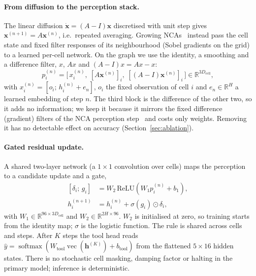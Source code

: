 \documentclass[10pt,twocolumn,letterpaper]{article}
\begin{document}
\paragraph{From diffusion to the perception stack.} The linear diffusion $\dot{\mathbf{x}} = (A-I)\mathbf{x}$ discretised with unit step gives $\mathbf{x}^{(n+1)} = A\mathbf{x}^{(n)}$, i.e.\ repeated averaging. Growing NCAs~\cite{mordvintsev2020growing} instead pass the cell state and fixed filter responses of its neighbourhood (Sobel gradients on the grid) to a learned per-cell network. On the graph we use the identity, a smoothing and a difference filter, $x$, $Ax$ and $(A-I)x = Ax - x$:
\begin{equation}\label{eq:perceive}
p_i^{(n)} = \bigl[\,x_i^{(n)},\; [A\mathbf{x}^{(n)}]_i,\; [(A-I)\mathbf{x}^{(n)}]_i\,\bigr] \in \mathbb{R}^{3D_{\text{cell}}},
\end{equation}
with $x_i^{(n)} = [o_i;\, h_i^{(n)} + e_n]$, $o_i$ the fixed observation of cell $i$ and $e_n\in\mathbb{R}^H$ a learned embedding of step $n$. The third block is the difference of the other two, so it adds no information; we keep it because it mirrors the fixed difference (gradient) filters of the NCA perception step~\cite{mordvintsev2020growing} and costs only weights. Removing it has no detectable effect on accuracy (Section~\ref{sec:ablation}).
\paragraph{Gated residual update.} A shared two-layer network (a $1\times1$ convolution over cells) maps the perception to a candidate update and a gate,
\begin{equation}\label{eq:update}
\begin{aligned}
[\delta_i;\, g_i] &= W_2\,\mathrm{ReLU}(W_1 p_i^{(n)} + b_1),\\
h_i^{(n+1)} &= h_i^{(n)} + \sigma(g_i) \odot \delta_i ,
\end{aligned}
\end{equation}
with $W_1\in\mathbb{R}^{96\times 3D_{\text{cell}}}$ and $W_2\in\mathbb{R}^{2H\times 96}$. $W_2$ is initialised at zero, so training starts from the identity map; $\sigma$ is the logistic function. The rule is shared across cells and steps. After $K$ steps the tool head reads $\hat y = \operatorname{softmax}(W_{\text{tool}}\operatorname{vec}(\mathbf{h}^{(K)}) + b_{\text{tool}})$ from the flattened $5\times16$ hidden states. There is no stochastic cell masking, damping factor or halting in the primary model; inference is deterministic.
\end{document}
